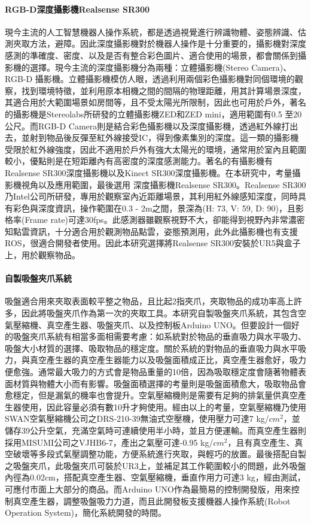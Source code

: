 \paragraph{RGB-D深度攝影機Realsense SR300}
現今主流的人工智慧機器人操作系統，都是透過視覺進行辨識物體、姿態辨識、估測夾取方法，避障。因此深度攝影機對於機器人操作是十分重要的，攝影機對深度感測的準確度、密度、以及是否有整合彩色圖片、適合使用的場景，都會關係到攝影機的選擇。現今主流的深度攝影機分為兩種：立體攝影機(Stereo Camera)、RGB-D 攝影機。立體攝影機模仿人眼，透過利用兩個彩色攝影機對同個環境的觀察，找到環境特徵，並利用原本相機之間的間隔的物理距離，用其計算場景深度，其適合用於大範圍場景如房間等，且不受太陽光所限制，因此也可用於戶外，著名的攝影機是Stereolabs所研發的立體攝影機ZED和ZED mini，適用範圍有0.5 至20公尺。而RGB-D Camera則是結合彩色攝影機以及深度攝影機，透過紅外線打出去，並射到物品後反彈至紅外線接受IC，得到像素集別的深度。這一類的攝影機受限於紅外線強度，因此不適用於戶外有強大太陽光的環境，通常用於室內且範圍較小，優點則是在短距離內有高密度的深度感測能力。著名的有攝影機有Realsense SR300深度攝影機以及Kinect SR300深度攝影機。在本研究中，考量攝影機視角以及應用範圍，最後選用 深度攝影機Realsense SR300。Realsense SR300乃Intel公司所研發，專用於觀察室內近距離場景，其利用紅外線感知深度，同時具有彩色與深度資訊，操作範圍在0.3 - 2m之間，景深為(H: 73, V: 59, D: 90)，且影格率(Frame rate)可達30fps。此感測器雖觀察視野不大，卻能得到視野內非常濃密知點雲資訊，十分適合用於觀測物品點雲，姿態預測用，此外此攝影機也有支援ROS，很適合開發者使用。因此本研究選擇將Realsense SR300安裝於UR5與盒子上，用於觀察物品。


\paragraph{自製吸盤夾爪系統}
吸盤適合用來夾取表面較平整之物品，且比起2指夾爪，夾取物品的成功率高上許多，因此將吸盤夾爪作為第一次的夾取工具。本研究自製吸盤夾爪系統，其包含空氣壓縮機、真空產生器、吸盤夾爪、以及控制板Arduino UNO。但要設計一個好的吸盤夾爪系統有相當多面相需要考慮：如系統對於物品的垂直吸力與水平吸力、吸盤大小材質的選擇、吸取物品的穩定度。關於系統的對物品的垂直吸力與水平吸力，與真空產生器的真空產生器能力以及吸盤面積成正比，真空產生器愈好，吸力便愈強。通常最大吸力的方式會是物品重量的10倍，因為吸取穩定度會隨著物體表面材質與物體大小而有影響。吸盤面積選擇的考量則是吸盤面積愈大，吸取物品會愈穩定，但是漏氣的機率也會提升。空氣壓縮機則是需要有足夠的排氣量供真空產生器使用，因此容量必須有數10升才夠使用。經由以上的考量，空氣壓縮機乃使用SWAN空氣壓縮機公司之DRS-210-39無油式空壓機，使用壓力可達7 kg/$cm^{2}$，並儲存39公升空氣，充滿空氣時可連續使用半小時，並且方便運輸。而真空產生器則採用MISUMI公司之VJHB6-7，產出之氣壓可達-0.95 kg/$cm^{2}$，且有真空產生、真空破壞等多段式氣壓調整功能，方便系統進行夾取，與輕巧的放置。最後搭配自製之吸盤夾爪，此吸盤夾爪可裝於UR3上，並補足其工作範圍較小的問題，此外吸盤內徑為0.02cm，搭配真空產生器、空氣壓縮機，垂直作用力可達3 kg，經由測試，可應付市面上大部分的商品。而Arduino UNO作為最簡易的控制開發版，用來控制真空產生器，調整吸盤吸力力道，而且此開發板支援機器人操作系統(Robot Operation System)，簡化系統開發的時間。

